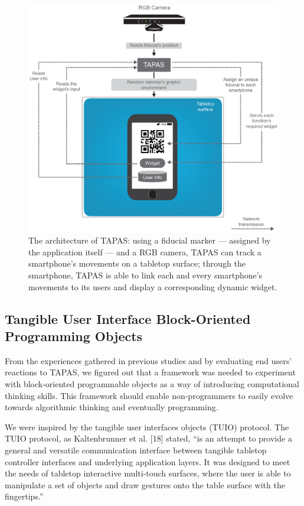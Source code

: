 \begin{figure}[ht!]
\centering
\includegraphics[width=\textwidth]{images/c4/TAPAS.eps}
\caption{The architecture of \ac{TAPAS}: using a fiducial marker --- assigned by the application itself --- and a RGB camera, \ac{TAPAS} can track a smartphone's movements on a tabletop surface; through the smartphone, \ac{TAPAS} is able to link each and every smartphone's movements to its users and display a corresponding dynamic widget.}\label{fig:arch}
\end{figure}

\subsection{Tangible User Interface Block-Oriented Programming Objects}
From the experiences gathered in previous studies and by evaluating end users' reactions to TAPAS, we figured out that a framework was needed to experiment with block-oriented programmable objects as a way of introducing computational thinking skills. This framework should enable non-programmers to easily evolve towards algorithmic thinking and eventually programming.

We were inspired by the tangible user interfaces objects (TUIO) protocol. The TUIO protocol, as Kaltenbrunner et al. [18] stated, ``is an attempt to provide a general and versatile communication interface between tangible tabletop controller interfaces and underlying application layers. It was designed to meet the needs of tabletop interactive multi-touch surfaces, where the user is able to manipulate a set of objects and draw gestures onto the table surface with the fingertips.''

